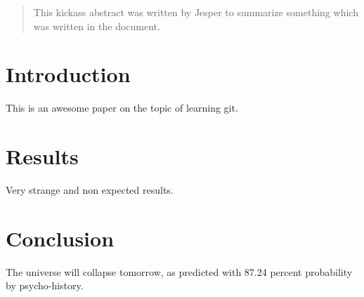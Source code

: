 \documentclass{article}
\begin{document}
\begin{abstract}
This kickass abstract was written by Jesper to summarize something which was written in the document.
\end{abstract}

\section{Introduction}

This is an awesome paper on the topic of learning git.

\section{Results}

Very strange and non expected results.  

\section{Conclusion}

The universe will collapse tomorrow, as predicted with 87.24 percent probability by psycho-history.
\end{document}
